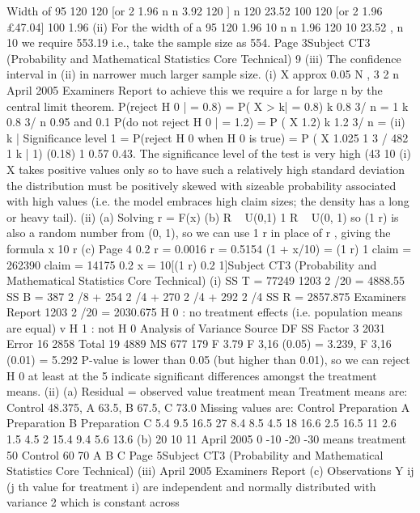 \documentclass[a4paper,12pt]{article}
\begin{document}
\begin{enumerate}
Width of 95%
120
120
[or 2 1.96
n
n
3.92
120
]
n
120
23.52
100
120
[or 2 1.96
£47.04]
100
1.96
(ii)
For the width of a 95%
120
1.96
10
n
n
1.96 120
10
23.52 , n
10 we require
553.19
i.e., take the sample size as 554.
Page 3Subject CT3 (Probability and Mathematical Statistics Core Technical)
9
(iii) The confidence interval in (ii) in narrower
much larger sample size.
(i) X approx
0.05
N
,
3 2
n
April 2005
Examiners Report
to achieve this we require a
for large n by the central limit theorem.
P(reject H 0 | = 0.8) = P( X > k| = 0.8)
k 0.8
3/ n
= 1
k 0.8
3/ n
0.95
and
0.1
P(do not reject H 0 | = 1.2)
= P ( X
1.2)
k 1.2
3/ n
=
(ii)
k |
Significance level
1
= P(reject H 0 when H 0 is true) = P ( X
1.025 1
3 / 482
1
k |
1)
(0.18) 1 0.57 0.43.
The significance level of the test is very high (43%
10
(i) X takes positive values only so to have such a relatively high standard
deviation the distribution must be positively skewed with sizeable probability
associated with high values (i.e. the model embraces high claim sizes; the
density has a long or heavy tail).
(ii) (a) Solving r = F(x)
(b) R ~ U(0,1) 1 R ~ U(0, 1) so (1 r) is also a random number from
(0, 1), so we can use 1 r in place of r , giving the formula
x 10 r
(c)
Page 4
0.2
r = 0.0016
r = 0.5154
(1 + x/10) = (1 r)
1
claim = 262390
claim = 14175
0.2
x = 10[(1
r)
0.2
1]Subject CT3 (Probability and Mathematical Statistics Core Technical)
(i)
SS T = 77249 1203 2 /20 = 4888.55
SS B = 387 2 /8 + 254 2 /4 + 270 2 /4 + 292 2 /4
SS R = 2857.875
Examiners Report
1203 2 /20 = 2030.675
H 0 : no treatment effects (i.e. population means are equal) v H 1 : not H 0
Analysis of Variance
Source
DF
SS
Factor
3
2031
Error
16
2858
Total
19
4889
MS
677
179
F
3.79
F 3,16 (0.05) = 3.239, F 3,16 (0.01) = 5.292
P-value is lower than 0.05 (but higher than 0.01), so we can reject H 0 at least
at the 5%
indicate significant differences amongst the treatment means.
(ii)
(a)
Residual = observed value treatment mean
Treatment means are: Control 48.375, A 63.5, B 67.5, C 73.0
Missing values are:
Control
Preparation A
Preparation B
Preparation C
5.4
9.5
16.5
27
8.4
8.5
4.5
18
16.6
2.5
16.5
11
2.6
1.5
4.5
2
15.4
9.4
5.6
13.6
(b)
20
10
11
April 2005
0
-10
-20
-30
means
treatment
50
Control
60
70
A
B
C
Page 5Subject CT3 (Probability and Mathematical Statistics Core Technical)
(iii)
April 2005
Examiners Report
(c) Observations Y ij (j th value for treatment i) are independent and
normally distributed with variance 2 which is constant across

\end{enumerate}
\end{document}
